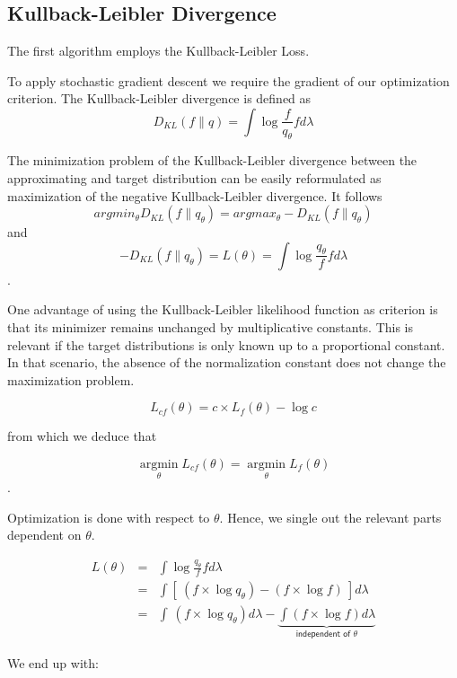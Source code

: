 \subsection{Kullback-Leibler Divergence}
 
The first algorithm employs the Kullback-Leibler Loss. 

To apply stochastic gradient descent we require the gradient of our optimization criterion. The Kullback-Leibler divergence is defined as
$$D_{KL}(f\|q) = \displaystyle \int \log \frac{f}{q_{\theta}} f d\lambda$$

The minimization problem of the Kullback-Leibler divergence between the approximating and target distribution can be easily reformulated as maximization of the negative Kullback-Leibler divergence. It follows 
$$argmin_\theta D_{KL}(f\|q_{\theta}) = argmax_\theta -D_{KL}(f\|q_{\theta}) $$
and 
$$ -D_{KL}(f\|q_{\theta}) = L(\theta) = \displaystyle \int \log \frac{q_\theta}{f} f d \lambda$$.

\bigskip
One advantage of using the Kullback-Leibler likelihood function as criterion is that its minimizer remains unchanged by multiplicative constants. This is relevant if the target distributions is only known up to a proportional constant. In that scenario, the absence of the normalization constant does not change the maximization problem.

$$L_{c f}(\theta) = c \times L_f(\theta) - \log c$$

from which we deduce that 

$$\operatorname{argmin}\limits_\theta L_{cf}(\theta) = \operatorname{argmin}\limits_\theta L_{f}(\theta)$$.

\bigskip

Optimization is done with respect to $\theta$. Hence, we single out the relevant parts dependent on $\theta$. 

$$
\begin{array}{lcl}
L(\theta) &=& \displaystyle \int \log \frac{q_\theta}{f} f d \lambda
\\
&=& \displaystyle\int\left[ \ \left(f \times \log q_\theta\right) - \left( f \times \log f \right) \ \right] d\lambda
\\
&=& \displaystyle\int \ \left(f \times \log q_\theta\right) d\lambda - \underbrace{\displaystyle\int \left( f \times \log f \right) d\lambda}_{\textsf{independent of } \theta}
\end{array}
$$

\bigskip

We end up with:


